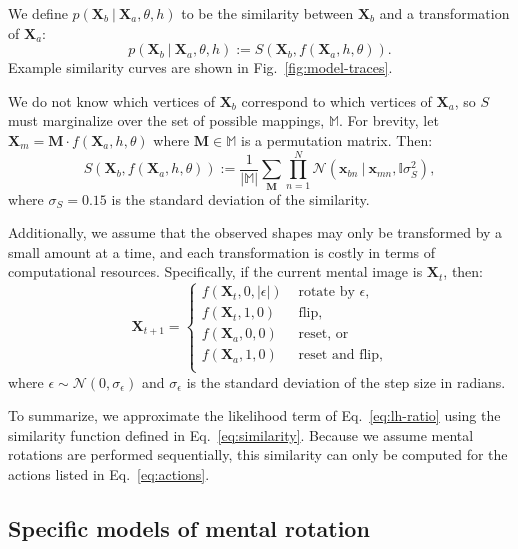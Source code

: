 \documentclass[10pt,letterpaper]{article}
\newcommand{\Xa}[0]{\mathbf{X}_a}
\newcommand{\Xb}[0]{\mathbf{X}_b}
\newcommand{\Xt}[0]{\mathbf{X}_t}
\newcommand{\M}[0]{\mathbf{M}}
\newcommand{\I}[0]{\mathbb{I}}
\begin{document}
We define $p(\Xb\ \vert\ \Xa, \theta, h)$ to be the similarity between
$\Xb$ and a transformation of $\Xa$:
\begin{equation}
  p(\Xb\ \vert\ \Xa, \theta, h):= S(\Xb, f(\Xa, h, \theta)).
  \label{eq:likelihood}
\end{equation}
Example similarity curves are shown in Fig.~\ref{fig:model-traces}.

We do not know which vertices of $\Xb$ correspond to which vertices of
$\Xa$, so $S$ must marginalize over the set of possible mappings,
$\mathbb{M}$. For brevity, let $\mathbf{X}_m=\M\cdot{}f(\Xa, h,
\theta)$ where $\M\in\mathbb{M}$ is a permutation matrix. Then:
\begin{equation}
  S(\Xb, f(\Xa, h, \theta)):=\frac{1}{|\mathbb{M}|} \sum_{\M} \prod_{n=1}^N \mathcal{N}(\mathbf{x}_{bn}\ \vert \ \mathbf{x}_{mn}, \I\sigma_S^2),
  \label{eq:similarity}
\end{equation}
where $\sigma_S=0.15$ is the standard deviation of the similarity.

Additionally, we assume that the observed shapes may only be
transformed by a small amount at a time, and each transformation is
costly in terms of computational resources. Specifically, if the
current mental image is $\Xt$, then:
\begin{equation}
  \mathbf{X}_{t+1} = \left\{ \begin{array}{ll}
      f(\Xt, 0, |\epsilon|) &\mbox{ rotate by $\epsilon$,} \\
      f(\Xt, 1, 0) &\mbox{ flip,} \\
      f(\Xa, 0, 0) &\mbox{ reset, or} \\
      f(\Xa, 1, 0) &\mbox{ reset and flip,} \\
    \end{array} \right.
  \label{eq:actions}
\end{equation}
where $\epsilon\sim \mathcal{N}(0, \sigma_\epsilon)$ and
$\sigma_\epsilon$ is the standard deviation of the step size in
radians.

To summarize, we approximate the likelihood term of
Eq.~\ref{eq:lh-ratio} using the similarity function defined in
Eq.~\ref{eq:similarity}. Because we assume mental rotations are
performed sequentially, this similarity can only be computed for the
actions listed in Eq.~\ref{eq:actions}.

\subsection{Specific models of mental rotation}
\end{document}
